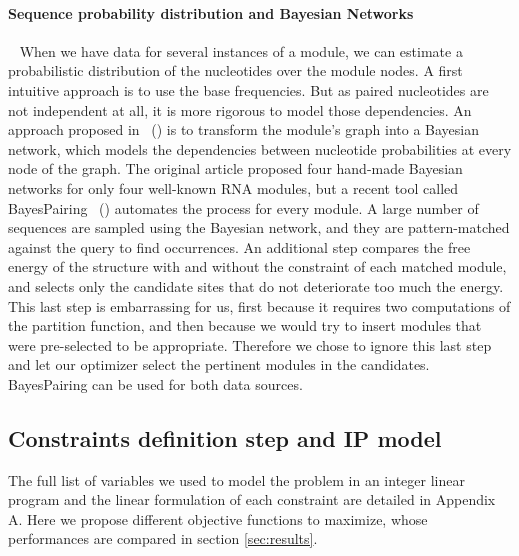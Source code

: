\documentclass{bioinfo}
\begin{document}
\begin{methods}
\paragraph{Sequence probability distribution and Bayesian Networks} ~ When we have data for several instances of a module, we can estimate a probabilistic distribution of the nucleotides over the module nodes. A first intuitive approach is to use the base frequencies. But as paired nucleotides are not independent at all, it is more rigorous to model those dependencies. An approach proposed in ~(\citealp{cruz2011sequence}) is to transform the module's graph into a Bayesian network, which models the dependencies between nucleotide probabilities at every node of the graph. The original article proposed four hand-made Bayesian networks for only four well-known RNA modules, but a recent tool called BayesPairing ~(\citealp{sarrazin2019automated}) automates the process for every module. A large number of sequences are sampled using the Bayesian network, and they are pattern-matched against the query to find occurrences. An additional step compares the free energy of the structure with and without the constraint of each matched module, and selects only the candidate sites that do not deteriorate too much the energy. This last step is embarrassing for us, first because it requires two computations of the partition function, and then because we would try to insert modules that were pre-selected to be appropriate. Therefore we chose to ignore this last step and let our optimizer select the pertinent modules in the candidates. BayesPairing can be used for both data sources.


\subsection{Constraints definition step and IP model} \label{sec:ip}
The full list of variables we used to model the problem in an integer linear program and the linear formulation of each constraint are detailed in Appendix A. Here we propose different objective functions to maximize, whose performances are compared in section \ref{sec:results}.


\end{methods}
\end{document}
